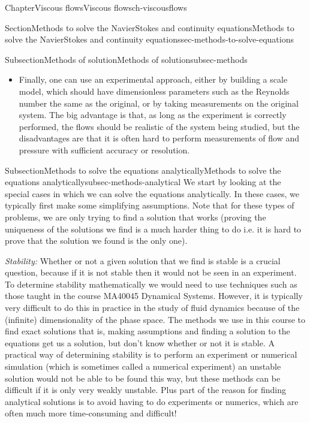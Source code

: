 \documentclass[oneside,10pt,]{book}
\newcommand{\ptxlistdisc}{\raisebox{0.3ex}{\textbullet}}
\numberwithin{equation}{section}
\begin{document}
\begin{chapterptx}{Chapter}{Viscous flows}{}{Viscous flows}{}{}{ch-viscousflows}
\begin{sectionptx}{Section}{Methods to solve the Navier\textendash{}Stokes and continuity equations}{}{Methods to solve the Navier\textendash{}Stokes and continuity equations}{}{}{sec-methods-to-solve-equations}
\begin{subsectionptx}{Subsection}{Methods of solution}{}{Methods of solution}{}{}{subsec-methods}
\begin{itemize}[label=\ptxlistdisc]
\item{}Finally, one can use an experimental approach, either by building a scale model, which should have dimensionless parameters such as the Reynolds number the same as the original, or by taking measurements on the original system. The big advantage is that, as long as the experiment is correctly performed, the flows should be realistic of the system being studied, but the disadvantages are that it is often hard to perform measurements of flow and pressure with sufficient accuracy or resolution.%
\end{itemize}
%
\end{subsectionptx}
%
%
\typeout{************************************************}
\typeout{************************************************}
%
\begin{subsectionptx}{Subsection}{Methods to solve the equations analytically}{}{Methods to solve the equations analytically}{}{}{subsec-methods-analytical}
We start by looking at the special cases in which we can solve the equations analytically. In these cases, we typically first make some simplifying assumptions. Note that for these types of problems, we are only trying to find a solution that works (proving the uniqueness of the solutions we find is a much harder thing to do \textendash{} i.e. it is hard to prove that the solution we found is the only one).%
\par
\emph{Stability:} Whether or not a given solution that we find is stable is a crucial question, because if it is not stable then it would not be seen in an experiment. To determine stability mathematically we would need to use techniques such as those taught in the course MA40045 Dynamical Systems. However, it is typically very difficult to do this in practice in the study of fluid dynamics because of the (infinite) dimensionality of the phase space. The methods we use in this course to find exact solutions \textendash{} that is, making assumptions and finding a solution to the equations \textendash{} get us a solution, but don't know whether or not it is stable. A practical way of determining stability is to perform an experiment or numerical simulation (which is sometimes called a numerical experiment) \textendash{} an unstable solution would not be able to be found this way, but these methods can be difficult if it is only very weakly unstable. Plus part of the reason for finding analytical solutions is to avoid having to do experiments or numerics, which are often much more time-consuming and difficult!%

\end{subsectionptx}
\end{sectionptx}
\end{chapterptx}
\end{document}
